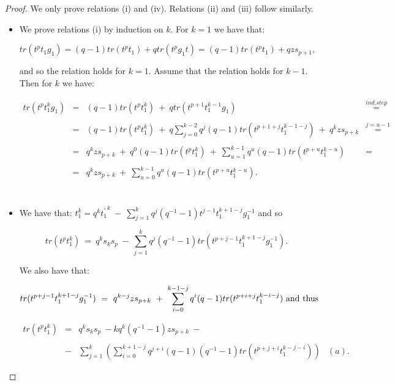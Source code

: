 \documentclass[11pt]{amsart}
\begin{document}
\begin{proof}
We only prove relations (i) and (iv). Relations (ii) and (iii) follow similarly.

\smallbreak

\begin{itemize}
\item[i.] We prove relations (i) by induction on $k$. For $k=1$ we have that:

$$tr(t^pt_1g_1)=(q-1)tr(t^pt_1)+qtr(t^pg_1t)=(q-1)tr(t^pt_1)+qzs_{p+1},$$ 

\noindent and so the relation holds for $k=1$. Assume that the relation holds for $k-1$. Then for $k$ we have:

\[
\begin{array}{lllc}
tr(t^pt_1^kg_1) & = & (q-1)tr(t^pt_1^k)\ +\ qtr(t^{p+1}t_1^{k-1}g_1) & \overset{ind. step}{=}\\
&&&\\
& = & (q-1)tr(t^pt_1^k)\ +\ q\sum_{j=0}^{k-2}{q^j(q-1)tr(t^{p+1+j}t_1^{k-1-j})}\ +\ q^k z s_{p+k} & \overset{j=u-1}{=}\\
&&&\\
& = & q^k z s_{p+k}\ +\  q^0(q-1)tr(t^pt_1^k)\ +\ \sum_{u=1}^{k-1}{q^u(q-1)tr(t^{p+u}t_1^{k-u})} & =\\
&&&\\
& = & q^k z s_{p+k}\ + \ \sum_{u=0}^{k-1}{q^u(q-1)tr(t^{p+u}t_1^{k-u})}. &\\
\end{array}
\]
\\

\item[iv.] We have that: $t_1^k  =  q^{k}{t_1^{\prime}}^k\ -\ \sum_{j=1}^{k}{q^{j}(q^{-1}-1)t^{j-1}t_1^{k+1-j}g_1^{-1}}$ and so

$$tr(t^pt_1^k)\ =\ q^ks_ks_p\ -\ \sum_{j=1}^{k}{q^j(q^{-1}-1)tr(t^{p+j-1}t_1^{k+1-j}g_1^{-1})}.$$

\noindent We also have that:

$$tr(t^{p+j-1}t_1^{k+1-j}g_1^{-1})\ = \ q^{k-j} z s_{p+k}\ +\ \sum_{i=0}^{k-1-j}{q^i(q-1)tr(t^{p+i+j}t_1^{k-i-j})}\ {\rm and\ thus}$$

\[
\begin{array}{lcll}
tr(t^pt_1^k) & = & q^ks_ks_p\ - kq^k(q^{-1}-1)zs_{p+k}\ -&\\
&&&\\
& - &  \sum_{j=1}^{k}{\left(\sum_{i=0}^{k+1-j}{q^{j+i}(q-1)(q^{-1}-1)tr(t^{p+j+i}t_1^{k-j-i})}\right)} & (a).
\end{array}
\]


\end{itemize}
\end{proof}
\end{document}
